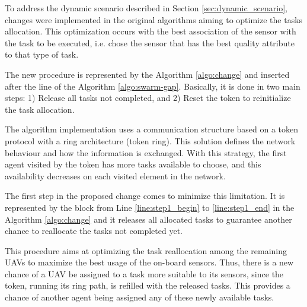 
To address the dynamic scenario described in Section \ref{sec:dynamic_scenario}, changes were implemented in the original algorithms aiming to optimize the tasks allocation. This optimization occurs with the best association of the sensor with the task to be executed, i.e. chose the sensor that has the best quality attribute to that type of task. 

The new procedure is represented by the Algorithm \ref{algo:change} and inserted after the line \label{line:ALini} of the Algorithm \ref{algo:swarm-gap}. Basically, it is done in two main steps: 1) Release all tasks not completed, and 2) Reset the token to reinitialize the task allocation. 

The algorithm implementation uses a communication structure based on a token protocol with a ring architecture (token ring). This solution defines the network behaviour and how the information is exchanged. With this strategy, the first agent visited by the token has more tasks available to choose, and this availability decreases on each visited element in the network.

The first step in the proposed change comes to minimize this limitation. It is represented by the block from Line \ref{line:step1_begin} to \ref{line:step1_end} in the Algorithm \ref{algo:change} and it releases all allocated tasks to guarantee another chance to reallocate the tasks not completed yet.

This procedure aims at optimizing the task reallocation among the remaining UAVs to maximize the best usage of the on-board sensors. Thus, there is a new chance of a UAV be assigned to a task more suitable to its sensors, since the token, running its ring path, is refilled with the released tasks. This provides a chance of another agent being assigned any of these newly available tasks.

